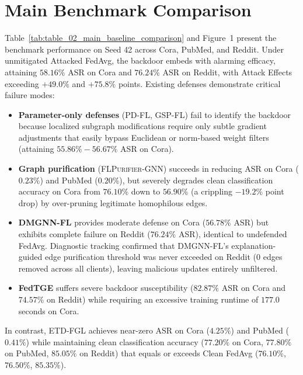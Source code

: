 \section{Main Benchmark Comparison}
\label{sec:main_results}
Table~\ref{tab:table_02_main_baseline_comparison} and Figure~1 present the benchmark performance on Seed 42 across Cora, PubMed, and Reddit.
Under unmitigated Attacked FedAvg, the backdoor embeds with alarming efficacy, attaining $58.16\%$ ASR on Cora and $76.24\%$ ASR on Reddit, with Attack Effects exceeding $+49.0\%$ and $+75.8\%$ points.
Existing defenses demonstrate critical failure modes:
\begin{itemize}
    \item \textbf{Parameter-only defenses} (\textsc{PD-FL}, \textsc{GSP-FL}) fail to identify the backdoor because localized subgraph modifications require only subtle gradient adjustments that easily bypass Euclidean or norm-based weight filters (attaining $55.86\% - 56.67\%$ ASR on Cora).
    \item \textbf{Graph purification} (\textsc{FLPurifier-GNN}) succeeds in reducing ASR on Cora ($0.23\%$) and PubMed ($0.20\%$), but severely degrades clean classification accuracy on Cora from $76.10\%$ down to $56.90\%$ (a crippling $-19.2\%$ point drop) by over-pruning legitimate homophilous edges.
    \item \textbf{DMGNN-FL} provides moderate defense on Cora ($56.78\%$ ASR) but exhibits complete failure on Reddit ($76.24\%$ ASR), identical to undefended FedAvg. Diagnostic tracking confirmed that DMGNN-FL's explanation-guided edge purification threshold was never exceeded on Reddit ($0$ edges removed across all clients), leaving malicious updates entirely unfiltered.
    \item \textbf{FedTGE} suffers severe backdoor susceptibility ($82.87\%$ ASR on Cora and $74.57\%$ on Reddit) while requiring an excessive training runtime of $177.0$ seconds on Cora.
\end{itemize}
In contrast, \textsc{ETD-FGL} achieves near-zero ASR on Cora ($4.25\%$) and PubMed ($0.41\%$) while maintaining clean classification accuracy ($77.20\%$ on Cora, $77.80\%$ on PubMed, $85.05\%$ on Reddit) that equals or exceeds Clean FedAvg ($76.10\%$, $76.50\%$, $85.35\%$).

